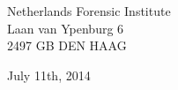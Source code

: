 \begin{titlepage}
\begin{addmargin}[-1cm]{-3cm}
\begin{center}
\vspace{0.25cm}

Netherlands Forensic Institute\\
Laan van Ypenburg 6 \\
2497 GB DEN HAAG 

\vspace{1.5cm}

July 11th, 2014

\end{center}
\end{addmargin}
\end{titlepage}
